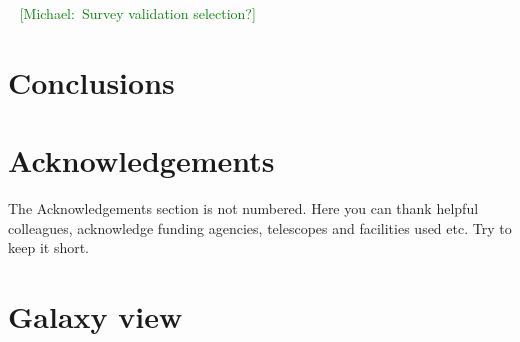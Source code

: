 \documentclass[fleqn,usenatbib]{mnras}
\newcommand{\mike}[1]{~\newline\noindent \textcolor{Green}{{ [Michael:~{#1}]\\}}}
\begin{document}
\mike{Survey validation selection?}

\section{Conclusions}

\section*{Acknowledgements}

The Acknowledgements section is not numbered. Here you can thank helpful
colleagues, acknowledge funding agencies, telescopes and facilities used etc.
Try to keep it short.









\appendix
\section{Galaxy view}
\end{document}
